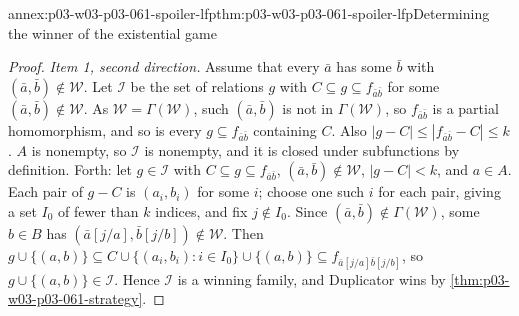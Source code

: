\begin{annexitem}{annex:p03-w03-p03-061-spoiler-lfp}{thm:p03-w03-p03-061-spoiler-lfp}{Determining the winner of the existential game}
\begin{proof}
\emph{Item 1, second direction.} Assume that every \(\bar a\) has some
\(\bar b\) with \((\bar a,\bar b)\notin\mathcal W\). Let \(\mathcal I\) be the
set of relations \(g\) with \(C\subseteq g\subseteq f_{\bar a\bar b}\) for
some \((\bar a,\bar b)\notin\mathcal W\). As \(\mathcal W=\Gamma(\mathcal W)\),
such \((\bar a,\bar b)\) is not in \(\Gamma(\mathcal W)\), so
\(f_{\bar a\bar b}\) is a partial homomorphism, and so is every
\(g\subseteq f_{\bar a\bar b}\) containing \(C\). Also
\(|g-C|\le|f_{\bar a\bar b}-C|\le k\). \(A\) is nonempty, so \(\mathcal I\)
is nonempty, and it is closed under subfunctions by definition. Forth: let
\(g\in\mathcal I\) with \(C\subseteq g\subseteq f_{\bar a\bar b}\),
\((\bar a,\bar b)\notin\mathcal W\), \(|g-C|<k\), and \(a\in A\). Each pair
of \(g-C\) is \((a_i,b_i)\) for some \(i\); choose one such \(i\) for each
pair, giving a set \(I_0\) of fewer than \(k\) indices, and fix \(j\notin
I_0\). Since \((\bar a,\bar b)\notin\Gamma(\mathcal W)\), some \(b\in B\) has
\((\bar a[j/a],\bar b[j/b])\notin\mathcal W\). Then
\(g\cup\{(a,b)\}\subseteq C\cup\{(a_i,b_i):i\in I_0\}\cup\{(a,b)\}
\subseteq f_{\bar a[j/a]\bar b[j/b]}\), so \(g\cup\{(a,b)\}\in\mathcal I\).
Hence \(\mathcal I\) is a winning family, and Duplicator wins by
\cref{thm:p03-w03-p03-061-strategy}.


\end{proof}
\end{annexitem}
